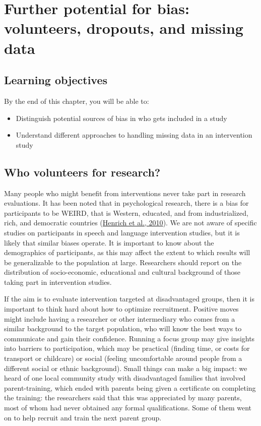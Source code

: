 \documentclass{krantz}
\begin{document}
\hypertarget{dropouts}{%
\chapter{Further potential for bias: volunteers, dropouts, and missing data}\label{dropouts}}

\hypertarget{learning-objectives-8}{%
\section{Learning objectives}\label{learning-objectives-8}}

By the end of this chapter, you will be able to:

\begin{itemize}
\item
  Distinguish potential sources of bias in who gets included in a study
\item
  Understand different approaches to handling missing data in an intervention study
\end{itemize}

\hypertarget{who-volunteers-for-research}{%
\section{Who volunteers for research?}\label{who-volunteers-for-research}}

Many people who might benefit from interventions never take part in research evaluations. It has been noted that in psychological research, there is a bias for participants to be WEIRD, that is Western, educated, and from industrialized, rich, and democratic countries (\protect\hyperlink{ref-henrich2010}{Henrich et al., 2010}). We are not aware of specific studies on participants in speech and language intervention studies, but it is likely that similar biases operate. It is important to know about the demographics of participants, as this may affect the extent to which results will be generalizable to the population at large. Researchers should report on the distribution of socio-economic, educational and cultural background of those taking part in intervention studies.

If the aim is to evaluate intervention targeted at disadvantaged groups, then it is important to think hard about how to optimize recruitment. Positive moves might include having a researcher or other intermediary who comes from a similar background to the target population, who will know the best ways to communicate and gain their confidence. Running a focus group may give insights into barriers to participation, which may be practical (finding time, or costs for transport or childcare) or social (feeling uncomfortable around people from a different social or ethnic background). Small things can make a big impact: we heard of one local community study with disadvantaged families that involved parent-training, which ended with parents being given a certificate on completing the training: the researchers said that this was appreciated by many parents, most of whom had never obtained any formal qualifications. Some of them went on to help recruit and train the next parent group.
\end{document}
